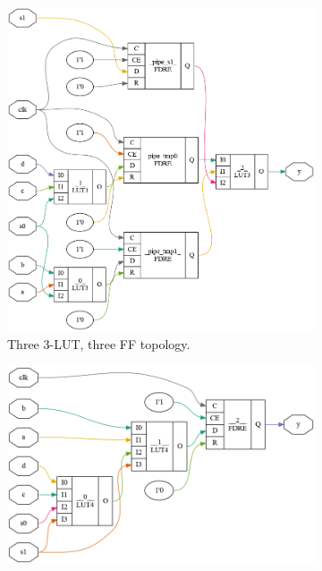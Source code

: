 \begin{figure}[tb]
    \begin{subfigure}{0.33\textwidth}
        \centering
        \includegraphics[width=\textwidth]{img/mux_4_1.png}
        \caption{Three 3-LUT, three FF topology.}\label{fig:retiming:a}
        \Description[]{}
    \end{subfigure}
    \begin{subfigure}{0.33\textwidth}
        \centering
        \includegraphics[width=\textwidth]{img/mux_4_1_retime_dsd.png}

\end{subfigure}
\end{figure}
